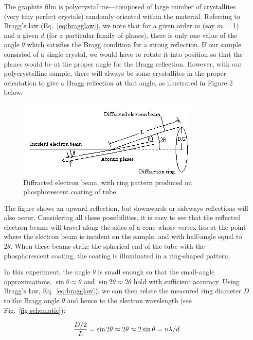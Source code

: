 The graphite film is polycrystalline---composed of large number of
crystallites (very tiny perfect crystals) randomly oriented within the
material.  Referring to Bragg's law (Eq.~\ref{eq:bragglaw}), we note
that for a given order $m$ (say $m$ = 1) and a given $d$ (for a particular
family of planes), there is only one value of the angle ${\theta}$
which satisfies the Bragg condition for a strong reflection.  If our
sample consisted of a single crystal, we would have to rotate it into
position so that the planes would be at the proper angle for the Bragg
reflection.  However, with our polycrystalline sample, there will
always be some crystallites in the proper orientation to give a Bragg
reflection at that angle, as illustrated in Figure 2 below.
\begin{figure}
\begin{centering}
\includegraphics[width=3.5634in,height=1.5311in]{../images/ediffraction-img2.png}
\caption{Diffracted electron beam, with ring pattern produced on phosphorescent coating of tube}
\label{fig:rings}
\end{centering}
\end{figure}

The figure shows an upward reflection, but downwards or sideways
reflections will also occur. Considering all these possibilities, it is
easy to see that the reflected electron beams will travel along the
sides of a cone whose vertex lies at the point where the electron beam
is incident on the sample, and with half-angle equal to $2{\theta}$.
 When these beams strike the spherical end of the tube with the
phosphorescent coating, the coating is illuminated in a ring-shaped
pattern.

In this experiment, the angle ${\theta}$ is small enough so that the
small-angle approximations, $\sin\theta \approx \theta$ and $\sin2\theta \approx 2\theta$  hold with sufficient accuracy.  Using
Bragg's law, Eq.~\ref{eq:bragglaw}), we can then relate the measured
ring diameter $D$ to the Bragg angle $\theta$ and hence to the electron
wavelength (see Fig.~\ref{fig:schematic}):

\begin{equation}
{ D/2 \over L } = \sin2\theta \approx 2\theta \approx 2\sin\theta = n\lambda/d
\end{equation}

